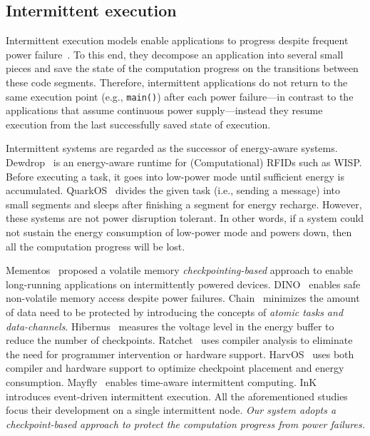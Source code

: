 \subsection{Intermittent execution}
Intermittent execution models enable applications to progress despite frequent power failure~\cite{van2016intermittent,colin2016chain,lucia2015simpler,bhatti2017harvos,gobieski2019intelligence}. To this end, they decompose an application into several small pieces and save the state of the computation progress on the transitions between these code segments. Therefore, intermittent applications do not return to the same execution point (e.g., \texttt{main()}) after each power failure---in contrast to the applications that assume continuous power supply---instead they resume execution from the last successfully saved state of execution.   

Intermittent systems are regarded as the successor of energy-aware systems. Dewdrop~\cite{buettner2011dewdrop} is an energy-aware runtime for (Computational) RFIDs such as WISP. Before executing a task, it goes into low-power mode until sufficient energy is accumulated. QuarkOS~\cite{zhang2013quarkos} divides the given task (i.e., sending a message) into small segments and sleeps after finishing a segment for energy recharge. However, these systems are not power disruption tolerant. In other words, if a system could not sustain the energy consumption of low-power mode and powers down, then all the computation progress will be lost. 

Mementos~\cite{mementos} proposed a volatile memory \emph{checkpointing-based} approach to enable long-running applications on intermittently powered devices. DINO~\cite{dino} enables safe non-volatile memory access despite power failures. Chain~\cite{colin2016chain} minimizes the amount of data need to be protected by introducing the concepts of \emph{atomic tasks and data-channels}. Hibernus~\cite{balsamo2015hibernus,balsamo2016hibernus++} measures the voltage level in the energy buffer to reduce the number of checkpoints. Ratchet~\cite{woude2016ratchet} uses compiler analysis to eliminate the need for programmer intervention or hardware support. HarvOS~\cite{bhatti2017harvos} uses both compiler and hardware support to optimize checkpoint placement and energy consumption. Mayfly~\cite{hester2017timely} enables time-aware intermittent computing. InK~\cite{yildirim2018ink} introduces event-driven intermittent execution. All the aforementioned studies focus their development on a single intermittent node. 
\emph{Our system adopts a checkpoint-based approach to protect the computation progress from power failures.}


